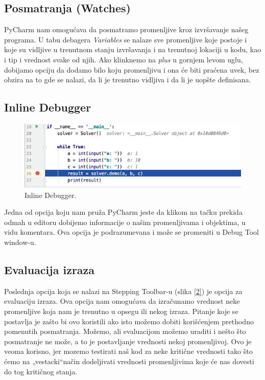 \documentclass[a4paper]{article}
\begin{document}
\subsection{Posmatranja (Watches)}
PyCharm nam omogućava da posmatramo promenljive kroz izvršavanje našeg programa. U tabu debagera \emph{Variables} se nalaze sve promenljive koje postoje i koje su vidljive u trenutnom stanju izvršavanja i na trenutnoj lokaciji u kodu, kao i tip i vrednost svake od njih\cite{pyCharm}. Ako klinknemo na \emph {plus} u gornjem levom uglu, dobijamo opciju da dodamo bilo koju promenljivu i ona će biti praćena uvek, bez obzira na to gde se nalazi, da li je trenutno vidljiva i da li je uopšte definisana\cite{pyCharm}.
\subsection{Inline Debugger}
\begin{figure}[h!]
\begin{center}
\includegraphics[scale = 0.4]{3}
\end{center}
\caption{Inline Debugger.}
\label{3}
\end{figure}
Jedna od opcija koju nam pruža PyCharm jeste da klikom na tačku prekida odmah u editoru dobijemo informacije o našim promenljivama i objektima, u vidu komentara. Ova opcija je podrazumevana i može se promeniti u Debug Tool window-u\cite{pyCharm}.
\subsection{Evaluacija izraza}
Poslednja opcija koja se nalazi na Stepping Toolbar-u (slika \ref{2}) je opcija za evaluaciju izraza. Ova opcija nam omogućava da izračunamo vrednost neke promenljive koja nam je trenutno u opsegu ili nekog izraza\cite{pyCharm}. Pitanje koje se postavlja je zašto bi ovo koristili ako isto možemo dobiti korišćenjem prethodno pomenutih posmatranja. Možemo, ali evaluacijom možemo uraditi i nešto što posmatranje ne može, a to je postavljanje vrednosti nekoj promenljivoj\cite{pyCharm}. Ovo je veoma korisno, jer mozemo testirati naš kod za neke kritične vrednosti tako što ćemo na „vestacki“\space način dodeljivati vrednosti promenljivima koje će nas dovesti do tog kritičnog stanja.
\end{document}
